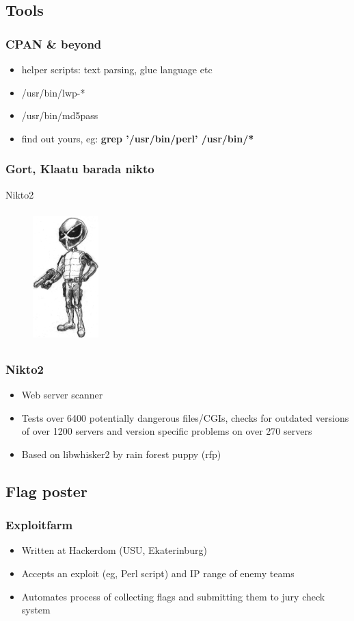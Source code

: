 \documentclass{beamer}
\begin{document}
\subsection{Tools}
\frame
{
\frametitle{CPAN \& beyond}
\begin{itemize}
\item<1-> helper scripts: text parsing, glue language etc
\item<2-> /usr/bin/lwp-*
\item<2-> /usr/bin/md5pass
\item<3-> find out yours, eg: \textbf{grep '/usr/bin/perl' /usr/bin/*}
\end{itemize}
}

\frame
{
\frametitle{Gort, Klaatu barada nikto}
Nikto2
\begin{figure}
\includegraphics[width=1in,height=2in]{pics/nikto.png}
\end{figure}
}

\frame
{
\frametitle{Nikto2}
\begin{itemize}
\item Web server scanner
\item Tests over 6400 potentially dangerous files/CGIs, checks for outdated versions of over 1200 servers and version specific problems on over 270 servers
\item Based on libwhisker2 by rain forest puppy (rfp)
\end{itemize}
}

\subsection{Flag poster}
\frame
{
\frametitle{Exploitfarm}
\begin{itemize}
\item Written at Hackerdom (USU, Ekaterinburg)
\item Accepts an exploit (eg, Perl script) and IP range of enemy teams
\item Automates process of collecting flags and submitting them to jury check system
\end{itemize}
}
\end{document}
